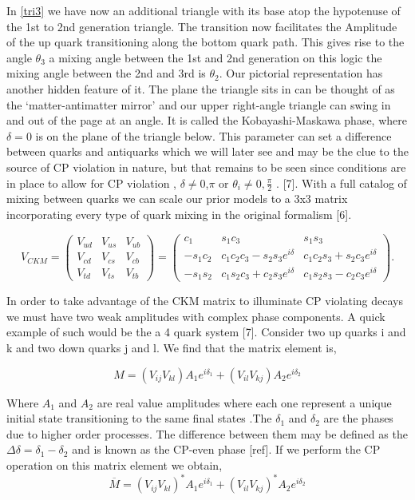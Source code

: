 \documentclass[floatfix,aps,prd,amsmath,amssymb]{revtex4}
\begin{document}
In \cref{tri3} we have now an additional triangle with its base atop the hypotenuse of the 1st to 2nd generation triangle. The transition now facilitates the Amplitude of the up quark transitioning along the bottom quark path. This gives rise to the angle $\theta_3$ a mixing angle between the 1st and 2nd generation on this logic the mixing angle between the 2nd and 3rd is $\theta_2$. Our pictorial representation has another hidden feature of it. The plane the triangle sits in can be thought of as the ‘matter-antimatter mirror’ and our upper right-angle triangle can swing in and out of the page at an angle. It is called the Kobayashi-Maskawa phase, where $\delta=0$ is on the plane of the triangle below. This parameter can set a difference between quarks and antiquarks which we will later see and may be the clue to the source of CP violation in nature, but that remains to be seen since  conditions are in place to allow for CP violation , $\delta\neq0$,$\pi$ or $\theta_i\neq0,\frac{\pi}{2}$ .  [7].
With a full catalog of mixing between quarks we can scale our prior models to a 3x3 matrix incorporating every type of quark mixing in the original formalism [6]. 

\[V_{CKM} = \left( \begin{array}{ccc} V_{ud} & V_{us} & V_{ub} \\ V_{cd} & V_{cs} & V_{cb} \\ V_{td} & V_{ts} & V_{tb} \end{array}\right) = \left( \begin{array}{ccc} c_1 & s_1 c_3 & s_1 s_3 \\ -s_1 c_2 & c_1 c_2 c_3 -s_2 s_3 e^{i\delta} & c_1 c_2 s_3 + s_2 c_3 e^{i\delta} \\ -s_1 s_2 & c_1 s_2 c_3 +c_2 s_3 e^{i\delta} & c_1 s_2 s_3 - c_2 c_3 e^{i\delta} \end{array} \right). \]

In order to take advantage of the CKM matrix to illuminate CP violating decays we must have two weak amplitudes with complex phase components. A quick example of such would be the a 4 quark system [7]. Consider two up quarks i and k and two down quarks j and l. We find that the matrix element is,

\[M=(V_{ij} V_{kl}) A_1 e^{i \delta_{1}} +(V_{il} V_{kj}) A_2 e^{i\delta_{2}}\] 

Where $A_1$ and $A_2$ are real value amplitudes where each one represent a unique initial state transitioning to the same final states .The $\delta_1$ and $\delta_2$ are the phases due to higher order processes. The difference between them may be defined as the $\Delta\delta = \delta_1 - \delta_2$ and is known as the CP-even phase [ref]. If we perform the CP operation on this matrix element we obtain,
\[\overline{M}=(V_{ij} V_{kl})^* A_1 e^{i\delta_1} +(V_{il} V_{kj})^* A_2 e^{i\delta_2}\]
\end{document}

